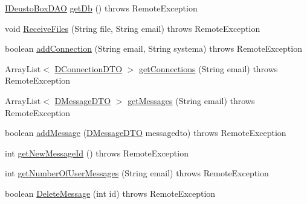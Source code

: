 \begin{DoxyCompactItemize}
\item 
\mbox{\hyperlink{interfacees_1_1deusto_1_1bspq18_1_1e6_1_1_deusto_box_1_1_server_1_1jdo_1_1dao_1_1_i_deusto_box_d_a_o}{I\+Deusto\+Box\+D\+AO}} \mbox{\hyperlink{interfacees_1_1deusto_1_1bspq18_1_1e6_1_1_deusto_box_1_1_server_1_1remote_1_1_i_deusto_box_remote_service_ac9d6749c6cebd4a9362975e1e3def1d8}{get\+Db}} ()  throws Remote\+Exception
\item 
void \mbox{\hyperlink{interfacees_1_1deusto_1_1bspq18_1_1e6_1_1_deusto_box_1_1_server_1_1remote_1_1_i_deusto_box_remote_service_aac41850e4367aa1213777b0e9ea3c213}{Receive\+Files}} (String file, String email)  throws Remote\+Exception
\item 
boolean \mbox{\hyperlink{interfacees_1_1deusto_1_1bspq18_1_1e6_1_1_deusto_box_1_1_server_1_1remote_1_1_i_deusto_box_remote_service_a77a145d7830ce7342da34df1efc71189}{add\+Connection}} (String email, String systema)  throws Remote\+Exception
\item 
Array\+List$<$ \mbox{\hyperlink{classes_1_1deusto_1_1bspq18_1_1e6_1_1_deusto_box_1_1_server_1_1dto_1_1_d_connection_d_t_o}{D\+Connection\+D\+TO}} $>$ \mbox{\hyperlink{interfacees_1_1deusto_1_1bspq18_1_1e6_1_1_deusto_box_1_1_server_1_1remote_1_1_i_deusto_box_remote_service_a10f948f7e473ff8f56ad6d421fe8db46}{get\+Connections}} (String email)  throws Remote\+Exception
\item 
Array\+List$<$ \mbox{\hyperlink{classes_1_1deusto_1_1bspq18_1_1e6_1_1_deusto_box_1_1_server_1_1dto_1_1_d_message_d_t_o}{D\+Message\+D\+TO}} $>$ \mbox{\hyperlink{interfacees_1_1deusto_1_1bspq18_1_1e6_1_1_deusto_box_1_1_server_1_1remote_1_1_i_deusto_box_remote_service_a1b7a5ce7fef3acd6e70e0a23bdb38a93}{get\+Messages}} (String email)  throws Remote\+Exception
\item 
boolean \mbox{\hyperlink{interfacees_1_1deusto_1_1bspq18_1_1e6_1_1_deusto_box_1_1_server_1_1remote_1_1_i_deusto_box_remote_service_a0915371c764b75738220b50a702335ad}{add\+Message}} (\mbox{\hyperlink{classes_1_1deusto_1_1bspq18_1_1e6_1_1_deusto_box_1_1_server_1_1dto_1_1_d_message_d_t_o}{D\+Message\+D\+TO}} messagedto)  throws Remote\+Exception
\item 
int \mbox{\hyperlink{interfacees_1_1deusto_1_1bspq18_1_1e6_1_1_deusto_box_1_1_server_1_1remote_1_1_i_deusto_box_remote_service_afa1bd951be454101604c8a2019da59f8}{get\+New\+Message\+Id}} ()  throws Remote\+Exception
\item 
int \mbox{\hyperlink{interfacees_1_1deusto_1_1bspq18_1_1e6_1_1_deusto_box_1_1_server_1_1remote_1_1_i_deusto_box_remote_service_a354457645b54345e47ecef75c16ddbd7}{get\+Number\+Of\+User\+Messages}} (String email)  throws Remote\+Exception
\item 
boolean \mbox{\hyperlink{interfacees_1_1deusto_1_1bspq18_1_1e6_1_1_deusto_box_1_1_server_1_1remote_1_1_i_deusto_box_remote_service_a1e33451aff8fea259054145fb9534453}{Delete\+Message}} (int id)  throws Remote\+Exception
\end{DoxyCompactItemize}



